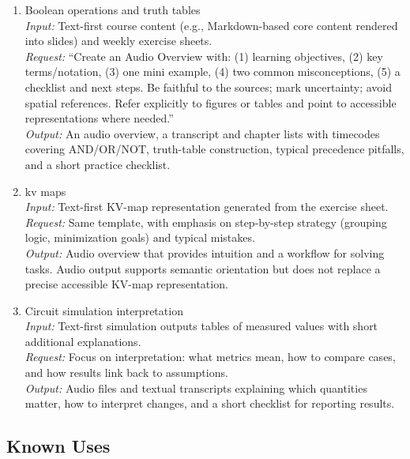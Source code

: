 \begin{enumerate}
    \item Boolean operations and truth tables\\
    \emph{Input:} Text-first course content (e.g., Markdown-based core content rendered into slides) and weekly exercise sheets.\\
    \emph{Request:} ``Create an Audio Overview with: (1) learning objectives, (2) key terms/notation, (3) one mini example, (4) two common misconceptions, (5) a checklist and next steps. Be faithful to the sources; mark uncertainty; avoid spatial references. Refer explicitly to figures or tables and point to accessible representations where needed.''\\
    \emph{Output:} An audio overview, a transcript and chapter lists with timecodes covering AND/OR/NOT, truth-table construction, typical precedence pitfalls, and a short practice checklist.

    \item \ac{kv} maps \\
    \emph{Input:} Text-first KV-map representation generated from the exercise sheet.\\
    \emph{Request:} Same template, with emphasis on step-by-step strategy (grouping logic, minimization goals) and typical mistakes.\\
    \emph{Output:} Audio overview that provides intuition and a workflow for solving tasks. Audio output supports semantic orientation but does not replace a precise accessible KV-map representation.

    \item Circuit simulation interpretation\\
    \emph{Input:} Text-first simulation outputs tables of measured values with short additional explanations.\\
    \emph{Request:} Focus on interpretation: what metrics mean, how to compare cases, and how results link back to assumptions.\\
    \emph{Output:} Audio files and textual transcripts explaining which quantities matter, how to interpret changes, and a short checklist for reporting results.
\end{enumerate}

\subsection*{Known Uses}

